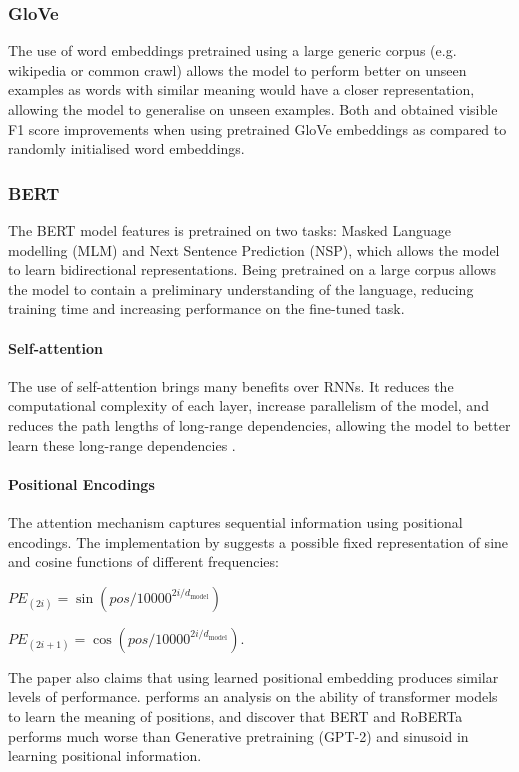 \documentclass[a4paper]{article}
\begin{document}
\begin{multicols}{2}
\subsubsection{GloVe}
The use of word embeddings pretrained using a large generic corpus (e.g. wikipedia or common crawl) allows the model to perform better on unseen examples as words with similar meaning would have a closer representation, allowing the model to generalise on unseen examples.
Both \citet{birnnattention} and \citet{kim_2019} obtained visible F1 score improvements when using pretrained GloVe \citep{glove} embeddings as compared to randomly initialised word embeddings. 
\subsubsection{BERT}
The BERT model features is pretrained on two tasks: Masked Language modelling (MLM) and Next Sentence Prediction (NSP), which allows the model to learn bidirectional representations. Being pretrained on a large corpus allows the model to contain a preliminary understanding of the language, reducing training time and increasing performance on the fine-tuned task.
\paragraph{Self-attention}
The use of self-attention brings many benefits over RNNs. It reduces the computational complexity of each layer, increase parallelism of the model, and reduces the path lengths of long-range dependencies, allowing the model to better learn these long-range dependencies \citep{attentionisallyouneed}.
\paragraph{Positional Encodings}
The attention mechanism captures sequential information using positional encodings. The implementation by \cite{attentionisallyouneed} suggests a possible fixed representation of sine and cosine functions of different frequencies: 

$PE_{(2i)} = \sin{(pos/10000^{2i/d_{\text{model}}})}$

$PE_{(2i+1)} = \cos{(pos/10000^{2i/d_{\text{model}}})}$. 

The paper also claims that using learned positional embedding produces similar levels of performance. \cite{positionembedding} performs an analysis on the ability of transformer models to learn the meaning of positions, and discover that BERT and RoBERTa performs much worse than Generative pretraining (GPT-2) and sinusoid in learning positional information.


\end{multicols}
\end{document}
